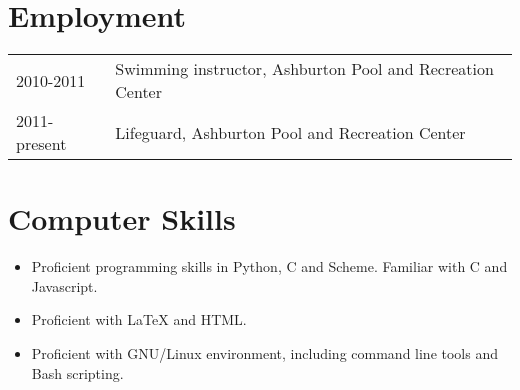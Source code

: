 \documentclass[12pt,a4paper]{article}
\newcommand{\CPP}
{C\nolinebreak[4]\hspace{-.05em}\raisebox{.22ex}{\footnotesize\bf ++ }}
\newenvironment{llist}
	{\renewcommand{\arraystretch}{1.5}\begin{tabular}{p{3cm} p{12cm}}}
	{\end{tabular}}
\begin{document}
\section*{Employment}
\begin{llist}
	2010-2011 & Swimming instructor, Ashburton Pool and Recreation Center \\
	2011-present & Lifeguard, Ashburton Pool and Recreation Center \\
\end{llist}

\section*{Computer Skills}
\begin{itemize}
	\item Proficient programming skills in Python, C and Scheme. Familiar with {\CPP} and Javascript.
	\item Proficient with {\LaTeX} and HTML.
	\item Proficient with GNU/Linux environment, including command line tools and Bash scripting.
\end{itemize}

\hfill \qedsymbol
\end{document}
